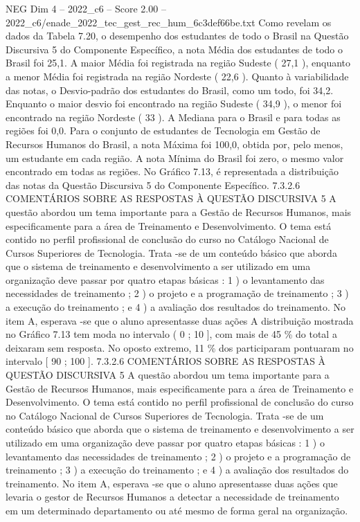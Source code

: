 \begin{textsample}{NEG Dim 4 – 2022\_c6 – Score 2.00 – 2022\_c6/enade\_2022\_tec\_gest\_rec\_hum\_6c3def66be.txt}
Como revelam os dados da Tabela 7.20, o desempenho dos estudantes de todo o Brasil na Questão Discursiva 5 do Componente Específico, a nota Média dos estudantes de todo o Brasil foi 25,1.
A maior Média foi registrada na região Sudeste ( 27,1 ), enquanto a menor Média foi registrada na região Nordeste ( 22,6 ).
Quanto à variabilidade das notas, o Desvio-padrão dos estudantes do Brasil, como um todo, foi 34,2.
Enquanto o maior desvio foi encontrado na região Sudeste ( 34,9 ), o menor foi encontrado na região Nordeste ( 33 ).
A Mediana para o Brasil e para todas as regiões foi 0,0.
Para o conjunto de estudantes de Tecnologia em Gestão de Recursos Humanos do Brasil, a nota Máxima foi 100,0, obtida por, pelo menos, um estudante em cada região.
A nota Mínima do Brasil foi zero, o mesmo valor encontrado em todas as regiões.
No Gráfico 7.13, é representada a distribuição das notas da Questão Discursiva 5 do Componente Específico. 7.3.2.6 COMENTÁRIOS SOBRE AS RESPOSTAS À QUESTÃO DISCURSIVA 5 A questão abordou um tema importante para a Gestão de Recursos Humanos, mais especificamente para a área de Treinamento e Desenvolvimento.
O tema está contido no perfil profissional de conclusão do curso no Catálogo Nacional de Cursos Superiores de Tecnologia.
Trata -se de um conteúdo básico que aborda que o sistema de treinamento e desenvolvimento a ser utilizado em uma organização deve passar por quatro etapas básicas : 1 ) o levantamento das necessidades de treinamento ; 2 ) o projeto e a programação de treinamento ; 3 ) a execução do treinamento ; e 4 ) a avaliação dos resultados do treinamento.
No item A, esperava -se que o aluno apresentasse duas ações A distribuição mostrada no Gráfico 7.13 tem moda no intervalo ( 0 ; 10 ], com mais de 45 \% do total a deixaram sem resposta.
No oposto extremo, 11 \% dos participaram pontuaram no intervalo [ 90 ; 100 ]. 7.3.2.6 COMENTÁRIOS SOBRE AS RESPOSTAS À QUESTÃO DISCURSIVA 5 A questão abordou um tema importante para a Gestão de Recursos Humanos, mais especificamente para a área de Treinamento e Desenvolvimento.
O tema está contido no perfil profissional de conclusão do curso no Catálogo Nacional de Cursos Superiores de Tecnologia.
Trata -se de um conteúdo básico que aborda que o sistema de treinamento e desenvolvimento a ser utilizado em uma organização deve passar por quatro etapas básicas : 1 ) o levantamento das necessidades de treinamento ; 2 ) o projeto e a programação de treinamento ; 3 ) a execução do treinamento ; e 4 ) a avaliação dos resultados do treinamento.
No item A, esperava -se que o aluno apresentasse duas ações que levaria o gestor de Recursos Humanos a detectar a necessidade de treinamento em um determinado departamento ou até mesmo de forma geral na organização.

\end{textsample}
